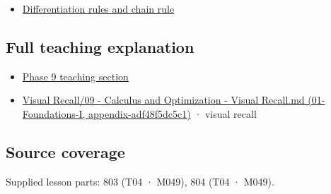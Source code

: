 \begin{itemize}
\tightlist
\item
  \hyperref[appendix-d9f70bdfbc92]{Differentiation rules and chain rule}
\end{itemize}

\subsection{Full teaching explanation}\label{full-teaching-explanation}

\begin{itemize}
\tightlist
\item
  \href{Continuous\%20Notes/Computing\%20Foundations\%20-\%20From\%20Bits\%20to\%20C++\%20and\%20Systems\%20APIs\#Functions,\%20limits,\%20continuity,\%20and\%20scalar\%20change}{Phase 9 teaching section}
\item
  \href{}{Visual Recall/09 - Calculus and Optimization - Visual Recall.md (01-Foundations-I, appendix-adf48f5dc5c1)} · visual recall
\end{itemize}

\subsection{Source coverage}\label{source-coverage}

Supplied lesson parts: 803 (T04 · M049), 804 (T04 · M049).
